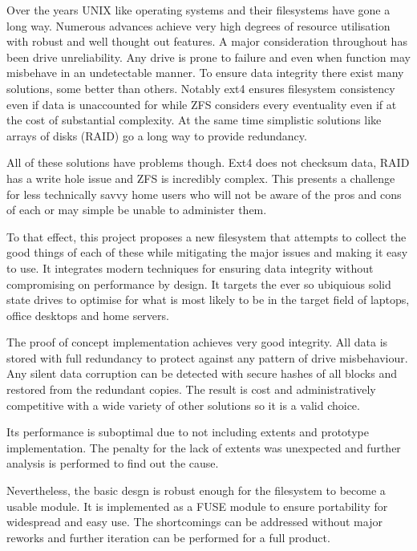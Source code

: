 Over the years UNIX like operating systems and their filesystems have gone a
long way. Numerous advances achieve very high degrees of resource utilisation
with robust and well thought out features. A major consideration throughout has
been drive unreliability. Any drive is prone to failure and even when function
may misbehave in an undetectable manner. To ensure data integrity there exist
many solutions, some better than others. Notably ext4 ensures filesystem
consistency even if data is unaccounted for while ZFS considers every
eventuality even if at the cost of substantial complexity. At the same time
simplistic solutions like arrays of disks (RAID) go a long way to provide
redundancy.

All of these solutions have problems though. Ext4 does not checksum data, RAID
has a write hole issue and ZFS is incredibly complex. This presents a challenge
for less technically savvy home users who will not be aware of the pros and
cons of each or may simple be unable to administer them.

To that effect, this project proposes a new filesystem that attempts to collect
the good things of each of these while mitigating the major issues and making
it easy to use. It integrates modern techniques for ensuring data integrity
without compromising on performance by design.  It targets the ever so
ubiquious solid state drives to optimise for what is most likely to be in the
target field of laptops, office desktops and home servers.

The proof of concept implementation achieves very good integrity. All data is
stored with full redundancy to protect against any pattern of drive
misbehaviour. Any silent data corruption can be detected with secure hashes of
all blocks and restored from the redundant copies. The result is cost and
administratively competitive with a wide variety of other solutions so it is a
valid choice.

Its performance is suboptimal due to not including extents and prototype
implementation. The penalty for the lack of extents was unexpected and further
analysis is performed to find out the cause.

Nevertheless, the basic desgn is robust enough for the filesystem to become a
usable module. It is implemented as a FUSE module to ensure portability for
widespread and easy use. The shortcomings can be addressed without major
reworks and further iteration can be performed for a full product.

